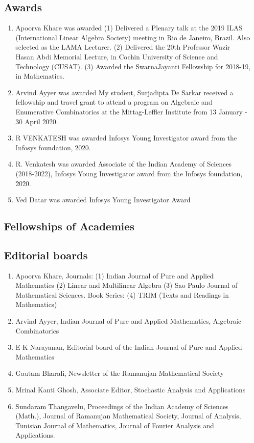 \subsection{Awards}

\begin{enumerate}
\item Apoorva Khare was awarded (1) Delivered a Plenary talk at the 2019 ILAS (International Linear Algebra Society) meeting in Rio de Janeiro, Brazil. Also selected as the LAMA Lecturer. (2) Delivered the 20th Professor Wazir Hasan Abdi Memorial Lecture, in Cochin University of Science and Technology (CUSAT). (3) Awarded the SwarnaJayanti Fellowship for 2018-19, in Mathematics.
\item Arvind Ayyer was awarded My student, Surjadipta De Sarkar received a fellowship and travel grant to attend a program on Algebraic and Enumerative Combinatorics at the Mittag-Leffler Institute from 13 January - 30 April 2020.
\item R VENKATESH was awarded Infosys Young Investigator award from the Infosys foundation, 2020.
\item R. Venkatesh was awarded Associate of the Indian Academy of Sciences (2018-2022), Infosys Young Investigator award from the Infosys foundation, 2020.
\item Ved Datar was awarded Infosys Young Investigator Award
\end{enumerate}


\subsection{Fellowships of Academies}



\subsection{Editorial boards}
\begin{enumerate}
\item Apoorva Khare, Journals: (1) Indian Journal of Pure and Applied Mathematics (2) Linear and Multilinear Algebra (3) Sao Paulo Journal of Mathematical Sciences. Book Series: (4) TRIM (Texts and Readings in Mathematics)
\item Arvind Ayyer, Indian Journal of Pure and Applied Mathematics, Algebraic Combinatorics
\item E K Narayanan, Editorial board of the Indian Journal of Pure and Applied Mathematics
\item Gautam Bharali, Newsletter of the Ramanujan Mathematical Society
\item Mrinal Kanti Ghosh, Associate Editor, Stochastic Analysis and Applications
\item Sundaram Thangavelu, Proceedings of the Indian Academy of Sciences (Math.), Journal of Ramanujan Mathematical Society, Journal of Analysis, Tunisian Journal of Mathematics, Journal of Fourier Analysis and Applications.
\end{enumerate}


